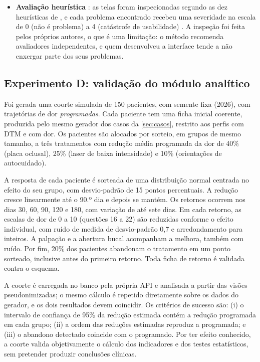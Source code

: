 \begin{itemize}
	\item \textbf{Avaliação heurística} \cite{nielsen1990}: as telas foram inspecionadas segundo as dez heurísticas de , e cada problema encontrado recebeu uma severidade na escala de 0 (não é problema) a 4 (catástrofe de usabilidade) \cite{nielsenmack1994}. A inspeção foi feita pelos próprios autores, o que é uma limitação: o método recomenda avaliadores independentes, e quem desenvolveu a interface tende a não enxergar parte dos seus problemas.
\end{itemize}

\subsection{Experimento D: validação do módulo analítico}
\label{sec:exp-analitico}

Foi gerada uma coorte simulada de 150 pacientes, com semente fixa (2026), com trajetórias de dor \emph{programadas}. Cada paciente tem uma ficha inicial coerente, produzida pelo mesmo gerador dos casos da \autoref{sec:casos}, restrito aos perfis com DTM e com dor. Os pacientes são alocados por sorteio, em grupos de mesmo tamanho, a três tratamentos com redução média programada da dor de 40\% (placa oclusal), 25\% (laser de baixa intensidade) e 10\% (orientações de autocuidado).

A resposta de cada paciente é sorteada de uma distribuição normal centrada no efeito do seu grupo, com desvio-padrão de 15 pontos percentuais. A redução cresce linearmente até o 90.º dia e depois se mantém. Os retornos ocorrem nos dias 30, 60, 90, 120 e 180, com variação de até sete dias. Em cada retorno, as escalas de dor de 0 a 10 (questões 16 a 22) são reduzidas conforme o efeito individual, com ruído de medida de desvio-padrão 0,7 e arredondamento para inteiros. A palpação e a abertura bucal acompanham a melhora, também com ruído. Por fim, 20\% dos pacientes abandonam o tratamento em um ponto sorteado, inclusive antes do primeiro retorno. Toda ficha de retorno é validada contra o esquema.

A coorte é carregada no banco pela própria API e analisada a partir das visões pseudonimizadas; o mesmo cálculo é repetido diretamente sobre os dados do gerador, e os dois resultados devem coincidir. Os critérios de sucesso são: (i) o intervalo de confiança de 95\% da redução estimada contém a redução programada em cada grupo; (ii) a ordem das reduções estimadas reproduz a programada; e (iii) o abandono detectado coincide com o programado. Por ter efeito conhecido, a coorte valida objetivamente o cálculo dos indicadores e dos testes estatísticos, sem pretender produzir conclusões clínicas.

